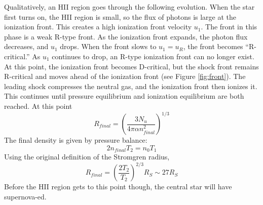 Qualitatively, an HII region goes through the following evolution.  When the star first turns on, 
the HII region is small, so the flux of photons is large at the ionization front.  This creates 
a high ionization front velocity $u_1$.  The front in this phase is a weak R-type front.  As 
the ionization front expands, the photon flux decreases, and $u_1$ drops.  When the front slows 
to $u_1=u_R$, the front becomes ``R-critical.''  As $u_1$ continues to drop, an R-type ionization 
front can no longer exist.  At this point, the ionization front becomes D-critical, but the 
shock front remains R-critical and moves ahead of the ionization front (see Figure 
\ref{fig:front}).  The leading shock compresses the neutral gas, and the ionization front then 
ionizes it.  This continues until pressure equilibrium and ionization equilibrium are both 
reached.  At this point
\begin{equation}
R_{final}=\left(\frac{3N_u}{4\pi \alpha n_{final}^2}\right)^{1/3}
\end{equation}
The final density is given by pressure balance:
\begin{equation}
2n_{final}T_2=n_0T_1
\end{equation}
Using the original definition of the Stromgren radius, 
\begin{equation}
R_{final}=\left(\frac{2T_2}{T_2}\right)^{2/3}R_S\sim27R_S
\end{equation}
Before the HII region gets to this point though, the central star will have supernova-ed.  

